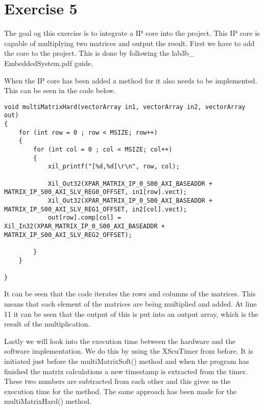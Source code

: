 
\chapter{Exercise 5}
The goal og this exercise is to integrate a IP core into the project. This IP core is capable of multiplying two matrices and output the result. First we have to add the core to the project. This is done by following the lab3b\_ EmbeddedSystem.pdf guide. 

When the IP core has been added a method for it also needs to be implemented. This can be seen in the code below.

\begin{lstlisting}
void multiMatrixHard(vectorArray in1, vectorArray in2, vectorArray out)
{
	for (int row = 0 ; row < MSIZE; row++)
	{
		for (int col = 0 ; col < MSIZE; col++)
		{
			xil_printf("[%d,%d]\r\n", row, col);
			
			Xil_Out32(XPAR_MATRIX_IP_0_S00_AXI_BASEADDR + MATRIX_IP_S00_AXI_SLV_REG0_OFFSET, in1[row].vect);
			Xil_Out32(XPAR_MATRIX_IP_0_S00_AXI_BASEADDR + MATRIX_IP_S00_AXI_SLV_REG1_OFFSET, in2[col].vect);
			out[row].comp[col] = Xil_In32(XPAR_MATRIX_IP_0_S00_AXI_BASEADDR + MATRIX_IP_S00_AXI_SLV_REG2_OFFSET);
			
		}
	}

}
\end{lstlisting}

It can be seen that the code iterates the rows and columns of the matrices. This means that each element of the matrices are being multiplied and added. At line 11 it can be seen that the output of this is put into an output array, which is the result of the multiplication. 

Lastly we will look into the execution time between the hardware and the software implementation. We do this by using the XScuTimer from before. It is initiated just before the multiMatrixSoft() method and when the program has finished the matrix calculations a new timestamp is extracted from the timer. These two numbers are subtracted from each other and this gives us the execution time for the method. The same approach has been made for the multiMatrixHard() method.



